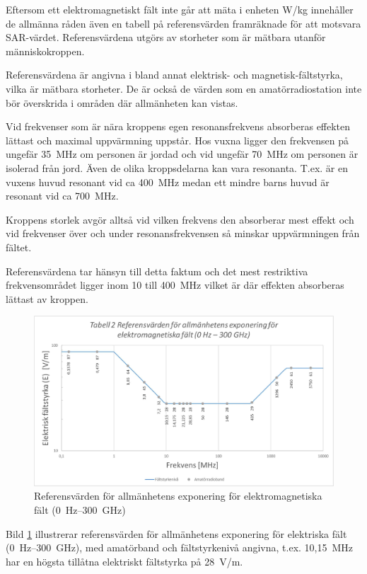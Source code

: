 Eftersom ett elektromagnetiskt fält inte går att mäta i enheten W/kg
innehåller de allmänna råden även en tabell på referensvärden
framräknade för att motsvara SAR-värdet.
Referensvärdena utgörs av storheter som är mätbara utanför människokroppen.

Referensvärdena är angivna i bland annat elektrisk- och
magnetisk-fältstyrka, vilka är mätbara storheter.
De är också de värden som en amatörradiostation inte bör överskrida i områden
där allmänheten kan vistas.

Vid frekvenser som är nära kroppens egen resonansfrekvens absorberas
effekten lättast och maximal uppvärmning uppstår.
Hos vuxna ligger den frekvensen på ungefär 35~MHz om personen är jordad och vid
ungefär 70~MHz om personen är isolerad från jord.
Även de olika kroppsdelarna kan vara resonanta.
T.ex. är en vuxens huvud resonant vid ca 400~MHz medan ett mindre barns huvud
är resonant vid ca 700~MHz.

Kroppens storlek avgör alltså vid vilken frekvens den absorberar mest effekt och
vid frekvenser över och under resonansfrekvensen så minskar uppvärmningen från
fältet.

Referensvärdena tar hänsyn till detta faktum och det mest restriktiva
frekvensområdet ligger inom 10 till 400~MHz vilket är där effekten
absorberas lättast av kroppen.

\begin{figure}[h]
\begin{center}
\includegraphics[width=14cm]{images/emfbild-000}
\caption{Referensvärden för allmänhetens exponering för elektromagnetiska fält (0~Hz--300~GHz)}
\label{fig:emf1}
\end{center}
\end{figure}

Bild \ref{fig:emf1} illustrerar referensvärden för allmänhetens
exponering för elektriska fält (0~Hz--300~GHz), med amatörband
och fältstyrkenivå angivna, t.ex. 10,15~MHz har en högsta tillåtna
elektriskt fältstyrka på 28~V/m.

